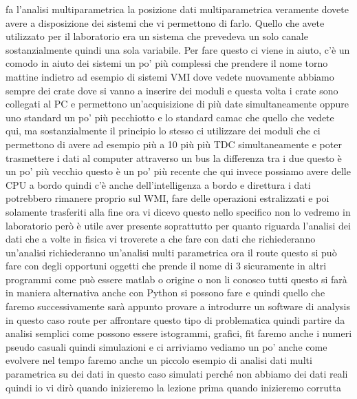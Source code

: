 fa l'analisi multiparametrica la posizione dati multiparametrica veramente dovete avere a disposizione dei sistemi che vi permettono di farlo. Quello che avete utilizzato per il laboratorio era un sistema che prevedeva un solo canale sostanzialmente quindi una sola variabile. Per fare questo ci viene in aiuto, c'è un comodo in aiuto dei sistemi un po' più complessi che prendere il nome torno mattine indietro ad esempio di sistemi VMI dove vedete nuovamente abbiamo sempre dei crate dove si vanno a inserire dei moduli e questa volta i crate sono collegati al PC e permettono un'acquisizione di più date simultaneamente oppure uno standard un po' più pecchiotto e lo standard camac che quello che vedete qui, ma sostanzialmente il principio lo stesso ci utilizzare dei moduli che ci permettono di avere ad esempio più a 10 più più TDC simultaneamente e poter trasmettere i dati al computer attraverso un bus la differenza tra i due questo è un po' più vecchio questo è un po' più recente che qui invece possiamo avere delle CPU a bordo quindi c'è anche dell'intelligenza a bordo e direttura i dati potrebbero rimanere proprio sul WMI, fare delle operazioni estralizzati e poi solamente trasferiti alla fine ora vi dicevo questo nello specifico non lo vedremo in laboratorio però è utile aver presente soprattutto per quanto riguarda l'analisi dei dati che a volte in fisica vi troverete a che fare con dati che richiederanno un'analisi richiederanno un'analisi multi parametrica ora il route questo si può fare con degli opportuni oggetti che prende il nome di 3 sicuramente in altri programmi come può essere matlab o origine o non li conosco tutti questo si farà in maniera alternativa anche con Python si possono fare e quindi quello che faremo successivamente sarà appunto provare a introdurre un software di analysis in questo caso route per affrontare questo tipo di problematica quindi partire da analisi semplici come possono essere istogrammi, grafici, fit faremo anche i numeri pseudo casuali quindi simulazioni e ci arriviamo vediamo un po' anche come evolvere nel tempo faremo anche un piccolo esempio di analisi dati multi parametrica su dei dati in questo caso simulati perché non abbiamo dei dati reali quindi io vi dirò quando inizieremo la lezione prima quando inizieremo corrutta